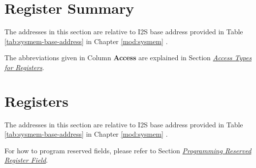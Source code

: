 \documentclass[main\_\_EN.tex]{subfiles}
\begin{document}



\newpage
\hypertarget{i2s-reg-summ}{}
\section{Register Summary}
\label{sec:i2s-reg-summ}

The addresses in this section are relative to I2S base address provided in Table \ref{tab:sysmem-base-address} in Chapter \ref{mod:sysmem} \textit{}.

The abbreviations given in Column \textbf{Access} are explained in Section \hyperref[glossary-access-types]{\textit{Access Types for Registers}}.





\newpage
\section{Registers}

The addresses in this section are relative to I2S base address provided in Table \ref{tab:sysmem-base-address} in Chapter \ref{mod:sysmem} \textit{}.

For how to program reserved fields, please refer to Section \hyperref[programming-reserved-field]{\textit{Programming Reserved Register Field}}.


\end{document}
